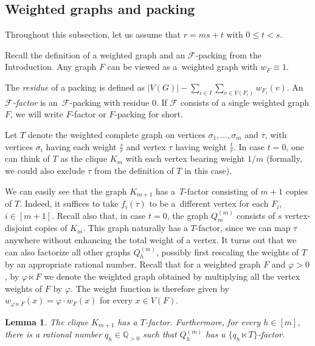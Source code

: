 \documentclass[reqno, 12pt]{amsart}
\numberwithin{equation}{section}
\numberwithin{figure}{section}
\theoremstyle{plain}
\newtheorem{lemma}[thm]{Lemma}
\theoremstyle{definition}
\let\phi=\varphi
\def\QQ{\mathds Q}
\def\cF{{\mathcal F}}
\begin{document}
    \subsection{Weighted graphs and packing}

    Throughout this subsection, let us assume that $r=ms+t$ with $0\leq t<s$.

    Recall the definition of a weighted graph and an $\cF$-packing from the Introduction.
    Any graph $F$ can be viewed as a~weighted graph with $w_F \equiv 1$. 
    
    The \textit{residue} of a packing is defined as $|V(G)|- \sum_{i \in I}\sum_{v \in V(F_i)}w_{F_i}(v)$. An \emph{$\mathcal{F}$-factor} is an~$\mathcal{F}$-packing with residue 0. If $\cF$ consists of a single weighted graph $F$, we will write $F$-factor or $F$-packing for short.
    
    Let $T$ denote the weighted complete graph on vertices $\sigma_1,\dots,\sigma_m$ and $\tau$, with vertices $\sigma_i$ having each weight $\frac{s}{r}$ and vertex $\tau$ having weight $\frac{t}{r}$. In case $t=0$, one can think of $T$ as the clique $K_m$ with each vertex bearing weight $1/m$ (formally, we could also exclude $\tau$ from the definition of $T$ in this case). 
    
    We can easily see that the graph $K_{m+1}$ has a~$T$-factor consisting of $m+1$ copies of $T$. Indeed, it suffices to take $f_i(\tau)$ to be a~different vertex for each $F_i$, $i\in[m+1]$. Recall also that, in case $t=0$, the graph $Q_m^{(m)}$ consists of $s$ vertex-disjoint copies of $K_m$. This graph naturally has a $T$-factor, since we can map $\tau$ anywhere without enhancing the total weight of a vertex. It turns out that we can also factorize all other graphs $Q_h^{(m)}$, possibly first rescaling the weights of $T$ by an appropriate rational number.
    Recall that for a weighted graph $F$ and $\phi > 0 $, by $\phi\ltimes F$ we denote the weighted graph obtained by multiplying all the vertex weights of $F$ by $\phi$. The weight function is therefore given by $w_{\phi\ltimes F}(x)=\phi \cdot w_F(x)$ for every $x\in V(F)$. 

    \begin{lemma}\label{l:factoring-Qh}
        The clique $K_{m+1}$ has a $T$-factor. Furthermore, for every $h\in [m]$, there is a rational number $q_h\in \QQ_{>0}$ such that $Q_h^{(m)}$ has a $\{q_h\ltimes T\}$-factor.
    \end{lemma}
    
\end{document}
